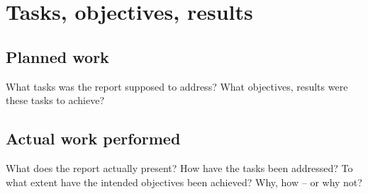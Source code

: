 \documentclass[a4paper,11pt,pdf]{pacmanreport}
\begin{document}
\newpage

\section{Tasks, objectives, results}

\subsection{Planned work}

What tasks was the report supposed to address? What objectives, results were these tasks to achieve?

\subsection{Actual work performed}

What does the report actually present? How have the tasks been addressed? To what extent have the intended objectives been achieved? Why, how -- or why not?










\end{document}
